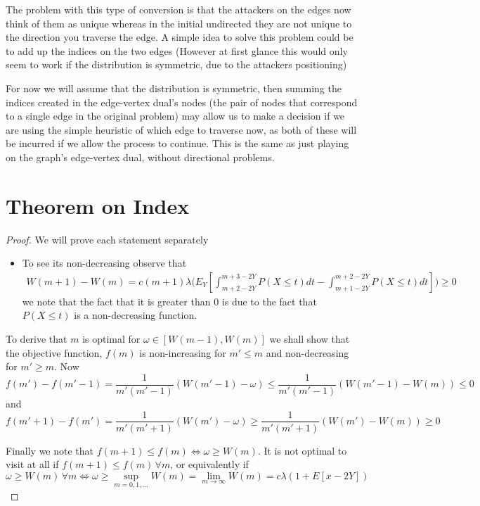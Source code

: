 \documentclass[a4paper,10pt]{article}
\theoremstyle{definition}
\theoremstyle{definition}
\theoremstyle{remark}
\theoremstyle{definition}
\begin{document}
The problem with this type of conversion is that the attackers on the edges now think of them as unique whereas in the initial undirected they are not unique to the direction you traverse the edge. A simple idea to solve this problem could be to add up the indices on the two edges (However at first glance this would only seem to work if the distribution is symmetric, due to the attackers positioning)
 
For now we will assume that the distribution is symmetric, then summing the indices created in the edge-vertex dual's nodes (the pair of nodes that correspond to a single edge in the original problem) may allow us to make a decision if we are using the simple heuristic of which edge to traverse now, as both of these will be incurred if we allow the process to continue. This is the same as just playing on the graph's edge-vertex dual, without directional problems.



\appendix
{}
\appendixpage
\addappheadtotoc

\section{Theorem on Index}
\label{Appendix: theorem on index}
\begin{proof}
We will prove each statement separately
\begin{itemize}
\item To see its non-decreasing observe that
\begin{align*}
W(m+1)-W(m)= c(m+1) \lambda \Bigg(E_{Y} \left[\int_{m+2-2Y}^{m+3-2Y} P(X \leq t) dt -\int_{m+1-2Y}^{m+2-2Y} P(X \leq t)dt \right] \Bigg) \geq 0
\end{align*}
we note that the fact that it is greater than 0 is due to the fact that $P(X \leq t )$ is a non-decreasing function.
\end{itemize}

\item To derive that $m$ is optimal for $\omega \in [W(m-1),W(m)]$ we shall show that the objective function, $f(m)$ is non-increasing for $m' \leq m$ and non-decreasing for $m' \geq m$.
Now 
$$f(m')-f(m'-1)=\frac{1}{m'(m'-1)} (W(m'-1)-\omega) \leq \frac{1}{m'(m'-1)} (W(m'-1)-W(m)) \leq 0$$
and
$$f(m'+1)-f(m')=\frac{1}{m'(m'+1)} (W(m') -\omega) \geq \frac{1}{m'(m'+1)} (W(m')-W(m)) \geq 0$$

\item Finally we note that $f(m+1) \leq f(m) \iff \omega \geq W(m)$. It is not optimal to visit at all if $f(m+1) \leq f(m) \, \forall m$, or equivalently
if $$\omega \geq W(m) \, \forall m \iff \omega \geq \sup\limits_{m=0,1,...} W(m)=\lim\limits_{m \rightarrow \infty} W(m)=c \lambda (1+ E[x-2Y])$$
\end{proof}
\end{document}

